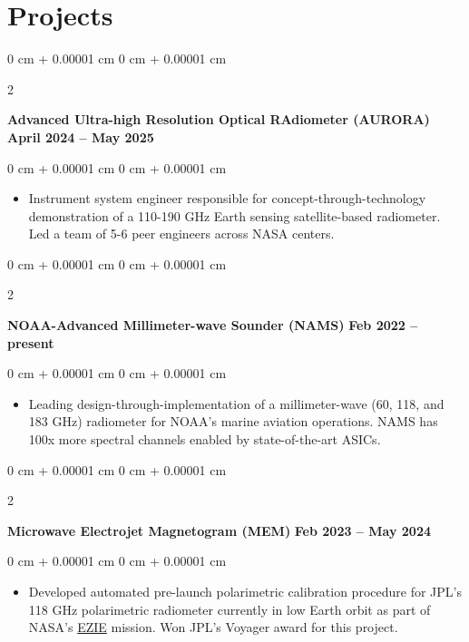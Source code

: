 \documentclass[10pt, letterpaper]{article}
\newenvironment{highlights}{
    \begin{itemize}[
        topsep=0.10 cm,
        parsep=0.10 cm,
        partopsep=0pt,
        itemsep=0pt,
        leftmargin=0 cm + 10pt     
    ]
}{
    \end{itemize}
} %
\newenvironment{onecolentry}{
    \begin{adjustwidth}{
        0 cm + 0.00001 cm
    }{
        0 cm + 0.00001 cm
    }
}{
    \end{adjustwidth}
} %
\newenvironment{twocolentry}[2][]{
    \onecolentry
    \def\secondColumn{#2}
    \setcolumnwidth{\fill, 4.5 cm}
    \begin{paracol}{2}
}{
    \switchcolumn \raggedleft \secondColumn
    \end{paracol}
    \endonecolentry
} %
\begin{document}
    \section{Projects}
       \justifying
        \begin{twocolentry}{
            \textbf{April 2024 -- May 2025}
        }
            \textbf{Advanced Ultra-high Resolution Optical RAdiometer (AURORA)}\end{twocolentry}

        \vspace{0.20 cm}
        \begin{onecolentry}
            \begin{highlights}
                \item Instrument system engineer responsible for concept-through-technology demonstration of a 110-190 GHz Earth sensing satellite-based radiometer. Led a team of 5-6 peer engineers across NASA centers.
            \end{highlights}
        \end{onecolentry}
        \vspace{0.3 cm}

        \begin{twocolentry}{
            \textbf{Feb 2022 -- present}
        }
            \textbf{NOAA-Advanced Millimeter-wave Sounder (NAMS)}\end{twocolentry}

        \vspace{0.20 cm}
        \begin{onecolentry}
            \begin{highlights}
                \item Leading design-through-implementation  of a millimeter-wave (60, 118, and 183 GHz) radiometer for NOAA's marine aviation operations. NAMS has 100x more spectral channels enabled by state-of-the-art ASICs. 
            \end{highlights}
        \end{onecolentry}
        \vspace{0.3 cm}

        \begin{twocolentry}{
            \textbf{Feb 2023 -- May 2024}
        }
            \textbf{Microwave Electrojet Magnetogram (MEM)}\end{twocolentry}

        \vspace{0.20 cm}
        \begin{onecolentry}
            \begin{highlights}
                \item Developed automated pre-launch polarimetric calibration procedure for JPL's 118 GHz polarimetric radiometer currently in low Earth orbit as part of NASA's  \href{https://science.nasa.gov/mission/ezie/}{EZIE} mission. Won JPL's Voyager award for this project.              
            \end{highlights}
        \end{onecolentry}
        \vspace{0.3cm}
        
\end{document}
